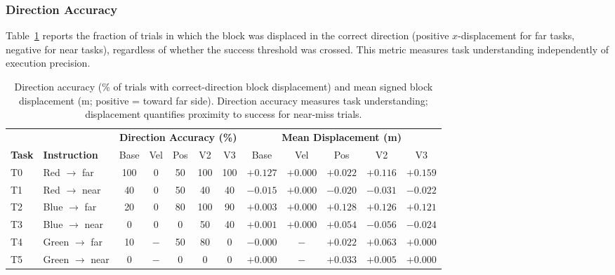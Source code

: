 \subsubsection{Direction Accuracy}

Table~\ref{tab:direction} reports the fraction of trials in which the block was
displaced in the correct direction (positive $x$-displacement for far tasks,
negative for near tasks), regardless of whether the success threshold was crossed.
This metric measures task understanding independently of execution precision.

\begin{table}[t]
\centering
\caption{Direction accuracy (\% of trials with correct-direction block displacement)
and mean signed block displacement (m; positive = toward far side).
Direction accuracy measures task understanding; displacement quantifies
proximity to success for near-miss trials.}
\label{tab:direction}
\setlength{\tabcolsep}{4.5pt}
\small
\begin{tabular}{@{}llcccccccccc@{}}
\toprule
& & \multicolumn{5}{c}{\textbf{Direction Accuracy (\%)}} &
    \multicolumn{5}{c}{\textbf{Mean Displacement (m)}} \\
\cmidrule(lr){3-7}\cmidrule(lr){8-12}
\textbf{Task} & \textbf{Instruction} &
    Base & Vel & Pos & V2 & V3 &
    Base & Vel & Pos & V2 & V3 \\
\midrule
T0 & Red $\to$ far   & 100 & 0  & 50  & 100 & 100 & $+0.127$ & $+0.000$ & $+0.022$ & $+0.116$ & $+0.159$ \\
T1 & Red $\to$ near  & 40  & 0  & 50  & 40  & 40  & $-0.015$ & $+0.000$ & $-0.020$ & $-0.031$ & $-0.022$ \\
T2 & Blue $\to$ far  & 20  & 0  & 80  & 100 & 90  & $+0.003$ & $+0.000$ & $+0.128$ & $+0.126$ & $+0.121$ \\
T3 & Blue $\to$ near & 0   & 0  & 0   & 50  & 40  & $+0.001$ & $+0.000$ & $+0.054$ & $-0.056$ & $-0.024$ \\
T4 & Green $\to$ far & 10  & $-$& 50  & 80  & 0   & $-0.000$ & $-$      & $+0.022$ & $+0.063$ & $+0.000$ \\
T5 & Green $\to$ near& 0   & $-$& 0   & 0   & 0   & $+0.000$ & $-$      & $+0.033$ & $+0.005$ & $+0.000$ \\
\bottomrule
\end{tabular}
\end{table}

